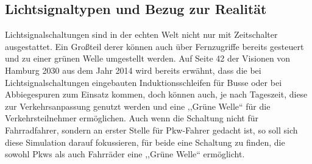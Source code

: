 %


\subsection{Lichtsignaltypen und Bezug zur Realität}\label{subsec:types}

Lichtsignalschaltungen sind in der echten Welt nicht nur mit Zeitschalter ausgestattet.
Ein Großteil derer können auch über Fernzugriffe bereits gesteuert und zu einer grünen Welle umgestellt werden.
Auf Seite 42 der Visionen von Hamburg 2030 \cite{HHH2014} aus dem Jahr 2014 wird bereits erwähnt, dass die bei Lichtsignalschaltungen eingebauten Induktionsschleifen für Busse oder bei Abbiegespuren zum Einsatz kommen, doch können auch, je nach Tageszeit, diese zur Verkehrsanpassung genutzt werden und eine ,,Grüne Welle`` für die Verkehrsteilnehmer ermöglichen.
Auch wenn die Schaltung nicht für Fahrradfahrer, sondern an erster Stelle für Pkw-Fahrer gedacht ist, so soll sich diese Simulation darauf fokussieren, für beide eine Schaltung zu finden, die sowohl Pkws als auch Fahrräder eine ,,Grüne Welle`` ermöglicht.
